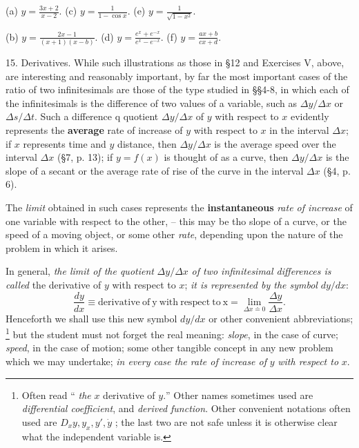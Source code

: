 \documentclass[12pt]{article}
\begin{document}
(a) $y=\displaystyle \frac{3x+2}{x-2}$.
(c) $y=\displaystyle \frac{1}{1-\cos x}$.
(e) $y=\displaystyle \frac{1}{\sqrt{1-x^{2}}}$.

(b) $y=\displaystyle \frac{2x-1}{(x+1)(x-b)}$.
(d) $y=\displaystyle \frac{e^{x}+e^{-x}}{e^{x}-e^{-x}}$.
(f) $y=\displaystyle \frac{ax+b}{cx+d}$.

15. Derivatives. While such illustrations as those in \S 12
and Exercises V, above, are interesting and reasonably important, 
by far the most important cases of the ratio of two infinitesimals 
are those of the type studied in \S\S 4-8, in which each
of the infinitesimals is the difference of two values of a variable, 
such as $\Delta y/\Delta x$ or $\Delta s/\Delta t$. Such a difference q
quotient $\Delta y/\Delta x$ of $y$ with respect to $x$ evidently 
represents the {\bf average}
rate of increase of $y$ with respect to $x$ in the interval $\Delta x$; 
if $x$ represents time and $y$ distance, then $\Delta y/\Delta x$ is the 
average speed over the interval $\Delta x$ (\S 7, p. 13); 
if $y=f(x)$ is thought of as a curve, then $\Delta y/\Delta x$ is the 
slope of a secant or the average rate of rise of the curve in the 
interval $\Delta x$ (\S 4, p. 6).

The {\it limit} obtained in such cases represents the {\bf instantaneous}
{\it rate of increase} of one variable with respect to the other, --
this may be tho slope of a curve, or the speed of a moving
object, or some other {\it rate}, depending upon the nature of the
problem in which it arises.

In general, {\it the limit of the quotient} $\Delta y/\Delta x$ 
{\it of two infinitesimal differences is called} the derivative of 
$y$ with respect to $x$; {\it it is represented by the symbol} $dy/dx$:
$$
\frac{dy}{dx} \equiv \mathrm{derivative\ of\ y\ with\ respect\ to\ x} =
\lim_{\Delta x \doteq 0} \frac{\Delta y}{\Delta x}.
$$
Henceforth we shall use this new symbol $dy/dx$ or other
convenient abbreviations; 
\footnote{Often read `` {\it the} $x$ derivative of $y.$'' Other names sometimes used are
{\it differential coefficient}, and {\it derived function}. 
Other convenient notations
often used are $D_{x}y, y_{x}, y',\dot{y}$ ; the last two are not safe 
unless it is otherwise
clear what the independent variable is.} 
but the student must not forget the
real meaning: {\it slope}, in the case of curve; 
{\it speed}, in the case of
motion; some other tangible concept in any new problem
which we may undertake; {\it in every case the rate of increase of}
$y$ {\it with respect to} $x$.
\end{document}
